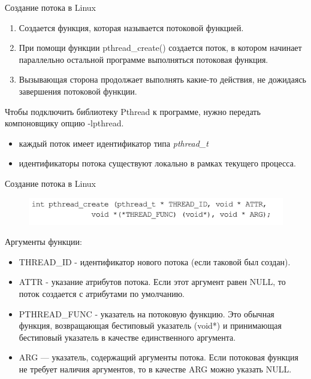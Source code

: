 \documentclass{beamer}
\begin{document}
\begin{frame}{Создание потока в Linux}
\begin{enumerate}
\item Создается функция, которая называется потоковой функцией.
\item При помощи функции pthread\_create() создается поток, в котором начинает параллельно остальной программе выполняться потоковая функция.
\item Вызывающая сторона продолжает выполнять какие-то действия, не дожидаясь завершения потоковой функции.
\end{enumerate}
Чтобы подключить библиотеку Pthread к программе, нужно передать компоновщику опцию -lpthread.
\begin{itemize}
\item каждый поток имеет идентификатор типа \textit{pthread\_t}
\item идентификаторы потока существуют локально в рамках текущего процесса.
\end{itemize}
\end{frame}

\begin{frame}{Создание потока в Linux}
\begin{figure}[h]
\centering
\includegraphics[scale=0.7]{images/lec08-pic01.png}
\end{figure}
Аргументы функции:
\begin{itemize}
\item THREAD\_ID - идентификатор нового потока (если таковой был создан).
\item ATTR - указание атрибутов потока. Если этот
аргумент равен NULL, то поток создается с атрибутами по умолчанию. 
\item PTHREAD\_FUNC - указатель на потоковую функцию. Это обычная функция, возвращающая бестиповый указатель (void*) и принимающая бестиповый указатель в качестве единственного аргумента.
\item ARG — указатель, содержащий аргументы потока. Если
потоковая функция не требует наличия аргументов, то в качестве ARG можно
указать NULL.
\end{itemize}
\end{frame}
\end{document}

